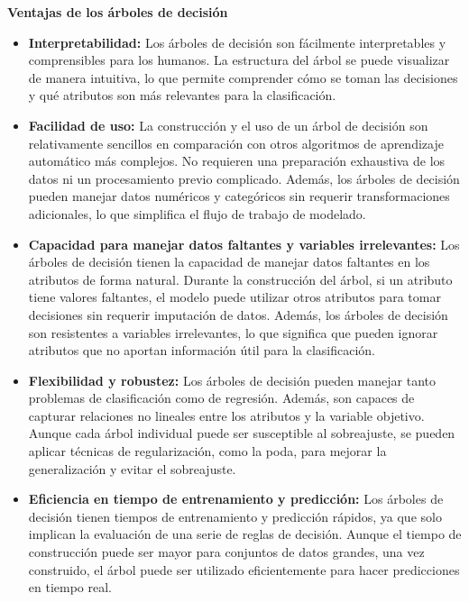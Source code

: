 \textbf{Ventajas de los árboles de decisión}
\begin{itemize}
    \item \textbf{Interpretabilidad:} Los árboles de decisión son fácilmente interpretables y comprensibles para los humanos. La estructura del árbol se puede visualizar de manera intuitiva, lo que permite comprender cómo se toman las decisiones y qué atributos son más relevantes para la clasificación.
    \item \textbf{Facilidad de uso:} La construcción y el uso de un árbol de decisión son relativamente sencillos en comparación con otros algoritmos de aprendizaje automático más complejos. No requieren una preparación exhaustiva de los datos ni un procesamiento previo complicado. Además, los árboles de decisión pueden manejar datos numéricos y categóricos sin requerir transformaciones adicionales, lo que simplifica el flujo de trabajo de modelado.
    \item \textbf{Capacidad para manejar datos faltantes y variables irrelevantes:} Los árboles de decisión tienen la capacidad de manejar datos faltantes en los atributos de forma natural. Durante la construcción del árbol, si un atributo tiene valores faltantes, el modelo puede utilizar otros atributos para tomar decisiones sin requerir imputación de datos. Además, los árboles de decisión son resistentes a variables irrelevantes, lo que significa que pueden ignorar atributos que no aportan información útil para la clasificación.
    \item \textbf{Flexibilidad y robustez:} Los árboles de decisión pueden manejar tanto problemas de clasificación como de regresión. Además, son capaces de capturar relaciones no lineales entre los atributos y la variable objetivo. Aunque cada árbol individual puede ser susceptible al sobreajuste, se pueden aplicar técnicas de regularización, como la poda, para mejorar la generalización y evitar el sobreajuste.
    \item \textbf{Eficiencia en tiempo de entrenamiento y predicción:} Los árboles de decisión tienen tiempos de entrenamiento y predicción rápidos, ya que solo implican la evaluación de una serie de reglas de decisión. Aunque el tiempo de construcción puede ser mayor para conjuntos de datos grandes, una vez construido, el árbol puede ser utilizado eficientemente para hacer predicciones en tiempo real.
\end{itemize}

